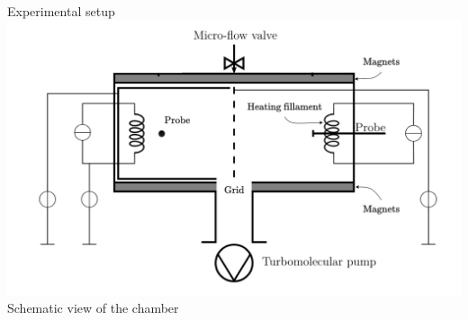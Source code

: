 \documentclass[10pt]{beamer}
\begin{document}
\begin{frame}{Experimental setup}
    \centering
    \includegraphics[width=\textwidth]{../figures/experimental_setup_Willemin_Zahar_mod.png} 
    \\
    \small Schematic view of the chamber\, 
\end{frame}
\end{document}
